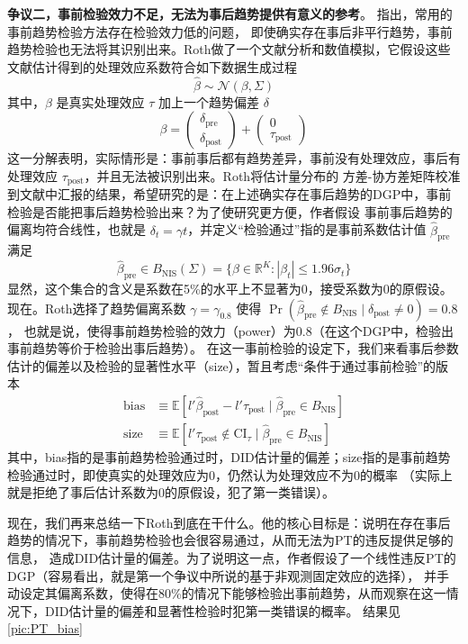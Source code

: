 \documentclass[../didNotes.tex]{subfiles}
\begin{document}
\textbf{争议二，事前检验效力不足，无法为事后趋势提供有意义的参考}。\textcite{roth2022} 指出，常用的事前趋势检验方法存在检验效力低的问题，
即使确实存在事后非平行趋势，事前趋势检验也无法将其识别出来。Roth做了一个文献分析和数值模拟，它假设这些文献估计得到的处理效应系数符合如下数据生成过程
$$
\hat{\beta} \sim \mathcal{N}(\beta, \Sigma)
$$
其中，$\beta$ 是真实处理效应 $\tau$ 加上一个趋势偏差 $\delta$
$$
\beta =
\begin{pmatrix}
  \delta_{\text{pre}} \\
  \delta_{\text{post}}
\end{pmatrix} +
\begin{pmatrix}
  0 \\
  \tau_{\text{post}}
\end{pmatrix}
$$
这一分解表明，实际情形是：事前事后都有趋势差异，事前没有处理效应，事后有处理效应 $\tau_{\text{post}}$，并且无法被识别出来。Roth将估计量分布的
方差-协方差矩阵校准到文献中汇报的结果，希望研究的是：在上述确实存在事后趋势的DGP中，事前检验是否能把事后趋势检验出来？为了使研究更方便，作者假设
事前事后趋势的偏离均符合线性，也就是 $\delta_{t} = \gamma t$，并定义``检验通过''指的是事前系数估计值 $\hat{\beta}_{\text{pre}}$ 满足
$$
\hat{\beta}_{\text{pre}} \in B_{\text{NIS}}(\Sigma) = \{ \beta \in \mathbb{R}^{K}: \left\vert \beta_{t}
\right\vert  \le 1.96 \sigma_{t} \}
$$
显然，这个集合的含义是系数在5\%的水平上不显著为0，接受系数为0的原假设。现在。Roth选择了趋势偏离系数 $\gamma = \gamma_{0.8}$ 使得
$\Pr(\hat{\beta}_{\text{pre}} \notin B_{\text{NIS}} \mid \delta_{\text{post}} \neq 0) = 0.8$，
也就是说，使得事前趋势检验的效力（power）为0.8（在这个DGP中，检验出事前趋势等价于检验出事后趋势）。
在这一事前检验的设定下，我们来看事后参数估计的偏差以及检验的显著性水平（size），暂且考虑``条件于通过事前检验''的版本
\begin{align*}
  \text{bias} & \equiv \mathbb{E}[l' \hat{\beta}_{\text{post}} - l' \tau_{\text{post}} \mid
  \hat{\beta}_{\text{pre}} \in B_{\text{NIS}}]                                                                \\
  \text{size} & \equiv \mathbb{E}[l' \tau_{\text{post}} \notin \text{CI}_{\tau} \mid \hat{\beta}_{\text{pre}}
  \in B_{\text{NIS}}]
\end{align*}
其中，bias指的是事前趋势检验通过时，DID估计量的偏差；size指的是事前趋势检验通过时，即使真实的处理效应为0，仍然认为处理效应不为0的概率
（实际上就是拒绝了事后估计系数为0的原假设，犯了第一类错误）。

现在，我们再来总结一下Roth到底在干什么。他的核心目标是：说明在存在事后趋势的情况下，事前趋势检验也会很容易通过，从而无法为PT的违反提供足够的信息，
造成DID估计量的偏差。为了说明这一点，作者假设了一个线性违反PT的DGP（容易看出，就是第一个争议中所说的基于非观测固定效应的选择），
并手动设定其偏离系数，使得在80\%的情况下能够检验出事前趋势，从而观察在这一情况下，DID估计量的偏差和显著性检验时犯第一类错误的概率。
结果见 \autoref{pic:PT_bias}
\end{document}
